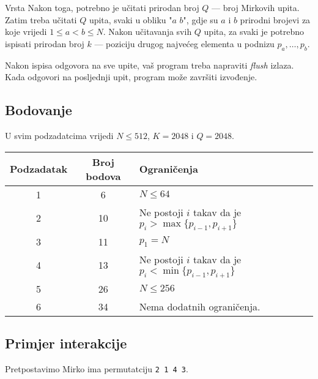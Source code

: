 \begin{statement}[
  problempoints=100,
  timelimit=1 sekunda,
  memorylimit=512 MiB,
]{Vrsta}
Nakon toga, potrebno je učitati prirodan broj $Q$ — broj Mirkovih upita. Zatim treba učitati $Q$ upita, svaki u obliku "$a$ $b$", gdje su $a$ i $b$ prirodni brojevi za koje vrijedi $1 \le a < b \le N$. Nakon učitavanja svih $Q$ upita, za svaki je potrebno ispisati prirodan broj $k$ — poziciju drugog najvećeg elementa u podnizu $p_a, \ldots, p_b$.

Nakon ispisa odgovora na sve upite, vaš program treba napraviti \textit{flush} izlaza. Kada odgovori na posljednji upit, program može završiti izvođenje.

\subsection*{Bodovanje}

U svim podzadatcima vrijedi $N \leq 512$, $K = 2048$ i $Q = 2048$.

{\renewcommand{\arraystretch}{1.4}
  \setlength{\tabcolsep}{6pt}
  \begin{tabular}{ccl}
   Podzadatak & Broj bodova & Ograničenja \\ \midrule
   	1 & 6 & $N \leq 64$ \\
    2 & 10 & Ne postoji $i$ takav da je $p_i > \max\{p_{i - 1}, p_{i + 1}\}$ \\
    3 & 11 & $p_1 = N$ \\
    4 & 13 & Ne postoji $i$ takav da je $p_i < \min\{p_{i - 1}, p_{i + 1}\}$ \\
    5 & 26 & $N \leq 256$ \\
    6 & 34 & Nema dodatnih ograničenja. \\
\end{tabular}}

\subsection*{Primjer interakcije}

Pretpostavimo Mirko ima permutatciju \texttt{2 1 4 3}.


\end{statement}
